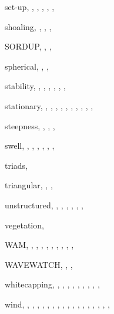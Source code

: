 \documentclass[12pt]{book}
\begin{document}
\begin{theindex}
  \item set-up, , , ,
		, , 
  \item shoaling, , , ,
  \item SORDUP, , , 
  \item spherical, , , 
  \item stability, , , ,
		, , ,
  \item stationary, , , ,
		, , ,
		, , ,
		, 
  \item steepness, , , ,
  \item swell, , , ,
		, , ,

  \indexspace

  \item triads, 
  \item triangular, , , 

  \indexspace

  \item unstructured, , , ,
		, , ,

  \indexspace

  \item vegetation, 

  \indexspace

  \item WAM, , , ,
		, , ,
		, , ,
  \item WAVEWATCH, , , 
  \item whitecapping, , , ,
		, , ,
		, , ,
  \item wind, , , ,
		, , ,
		, , ,
		, , ,
		, , ,
		, ,

\end{theindex}
\end{document}
